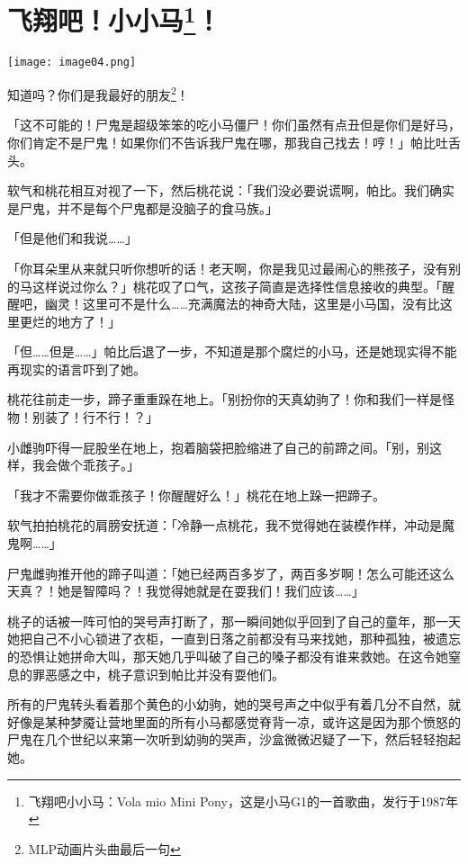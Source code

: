 \chapter[飞翔吧！小小马！]{\texorpdfstring{飞翔吧！小小马\footnote{飞翔吧小小马：Vola mio Mini Pony，这是小马G1的一首歌曲，发行于1987年}！}{飞翔吧！小小马！}}

\texttt{[image: image04.png]}


\begin{intro}
知道吗？你们是我最好的朋友\footnote{MLP动画片头曲最后一句}！
\end{intro}


「这不可能的！尸鬼是超级笨笨的吃小马僵尸！你们虽然有点丑但是你们是好马，你们肯定不是尸鬼！如果你们不告诉我尸鬼在哪，那我自己找去！哼！」帕比吐舌头。

软气和桃花相互对视了一下，然后桃花说：「我们没必要说谎啊，帕比。我们确实是尸鬼，并不是每个尸鬼都是没脑子的食马族。」

「但是他们和我说……」

「你耳朵里从来就只听你想听的话！老天啊，你是我见过最闹心的熊孩子，没有别的马这样说过你么？」桃花叹了口气，这孩子简直是选择性信息接收的典型。「醒醒吧，幽灵！这里可不是什么……充满魔法的神奇大陆，这里是小马国，没有比这里更烂的地方了！」

「但……但是……」帕比后退了一步，不知道是那个腐烂的小马，还是她现实得不能再现实的语言吓到了她。

桃花往前走一步，蹄子重重跺在地上。「别扮你的天真幼驹了！你和我们一样是怪物！别装了！行不行！？」

小雌驹吓得一屁股坐在地上，抱着脑袋把脸缩进了自己的前蹄之间。「别，别这样，我会做个乖孩子。」

「我才不需要你做乖孩子！你醒醒好么！」桃花在地上跺一把蹄子。

软气拍拍桃花的肩膀安抚道：「冷静一点桃花，我不觉得她在装模作样，冲动是魔鬼啊……」

尸鬼雌驹推开他的蹄子叫道：「她已经两百多岁了，两百多岁啊！怎么可能还这么天真？！她是智障吗？！我觉得她就是在耍我们！我们应该……」

桃子的话被一阵可怕的哭号声打断了，那一瞬间她似乎回到了自己的童年，那一天她把自己不小心锁进了衣柜，一直到日落之前都没有马来找她，那种孤独，被遗忘的恐惧让她拼命大叫，那天她几乎叫破了自己的嗓子都没有谁来救她。在这令她窒息的罪恶感之中，桃子意识到帕比并没有耍他们。

所有的尸鬼转头看着那个黄色的小幼驹，她的哭号声之中似乎有着几分不自然，就好像是某种梦魇让营地里面的所有小马都感觉脊背一凉，或许这是因为那个愤怒的尸鬼在几个世纪以来第一次听到幼驹的哭声，沙盒微微迟疑了一下，然后轻轻抱起她。

